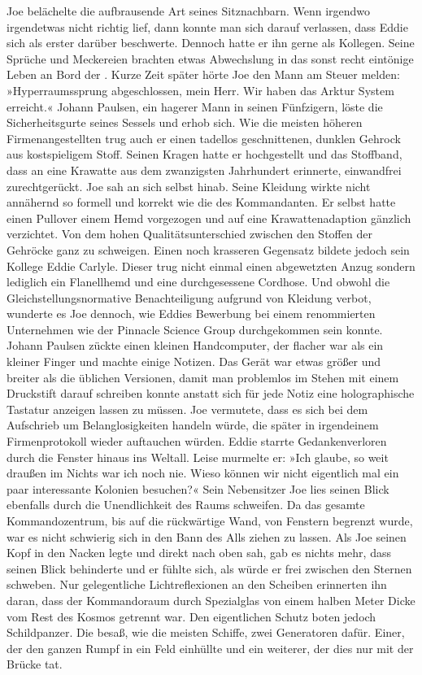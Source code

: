 Joe belächelte die aufbrausende Art seines Sitznachbarn.
Wenn irgendwo irgendetwas nicht richtig lief, dann konnte man sich darauf verlassen, dass Eddie sich als erster darüber beschwerte. Dennoch hatte er ihn gerne als Kollegen. Seine Sprüche und Meckereien brachten etwas Abwechslung in das sonst recht eintönige Leben an Bord der . 
Kurze Zeit später hörte Joe den Mann am Steuer melden: »Hyperraumssprung abgeschlossen, mein Herr. Wir haben das Arktur System erreicht.«
Johann Paulsen, ein hagerer Mann in seinen Fünfzigern, löste die Sicherheitsgurte seines Sessels und erhob sich. Wie die meisten höheren Firmenangestellten trug auch er einen tadellos geschnittenen, dunklen Gehrock aus kostspieligem Stoff. Seinen Kragen hatte er hochgestellt und das Stoffband, dass an eine Krawatte aus dem zwanzigsten Jahrhundert erinnerte, einwandfrei zurechtgerückt.
Joe sah an sich selbst hinab. Seine Kleidung wirkte nicht annähernd so formell und korrekt wie die des Kommandanten. Er selbst hatte einen Pullover einem Hemd vorgezogen und auf eine Krawattenadaption gänzlich verzichtet. Von dem hohen Qualitätsunterschied zwischen den Stoffen der Gehröcke ganz zu schweigen.
Einen noch krasseren Gegensatz bildete jedoch sein Kollege Eddie Carlyle. Dieser trug nicht einmal einen abgewetzten Anzug sondern lediglich ein Flanellhemd und eine durchgesessene Cordhose. Und obwohl die Gleichstellungsnormative Benachteiligung aufgrund von Kleidung verbot, wunderte es Joe dennoch, wie Eddies Bewerbung bei einem renommierten Unternehmen wie der Pinnacle Science Group durchgekommen sein konnte.
Johann Paulsen zückte einen kleinen Handcomputer, der flacher war als ein kleiner Finger und machte einige Notizen. Das Gerät war etwas größer und breiter als die üblichen Versionen, damit man problemlos im Stehen mit einem Druckstift darauf schreiben konnte anstatt sich für jede Notiz eine holographische Tastatur anzeigen lassen zu müssen.
Joe vermutete, dass es sich bei dem Aufschrieb um Belanglosigkeiten handeln würde, die später in irgendeinem Firmenprotokoll wieder auftauchen würden.
Eddie starrte Gedankenverloren durch die Fenster hinaus ins Weltall. Leise murmelte er: »Ich glaube, so weit draußen im Nichts war ich noch nie. Wieso können wir nicht eigentlich mal ein paar interessante Kolonien besuchen?«
Sein Nebensitzer Joe lies seinen Blick ebenfalls durch die Unendlichkeit des Raums schweifen. Da das gesamte Kommandozentrum, bis auf die rückwärtige Wand, von Fenstern begrenzt wurde, war es nicht schwierig sich in den Bann des Alls ziehen zu lassen. Als Joe seinen Kopf in den Nacken legte und direkt nach oben sah, gab es nichts mehr, dass seinen Blick behinderte und er fühlte sich, als würde er frei zwischen den Sternen schweben. Nur gelegentliche Lichtreflexionen an den Scheiben erinnerten ihn daran, dass der Kommandoraum durch Spezialglas von einem halben Meter Dicke vom Rest des Kosmos getrennt war. Den eigentlichen Schutz boten jedoch Schildpanzer. Die  besaß, wie die meisten Schiffe, zwei Generatoren dafür. Einer, der den ganzen Rumpf in ein Feld einhüllte und ein weiterer, der dies nur mit der Brücke tat.
